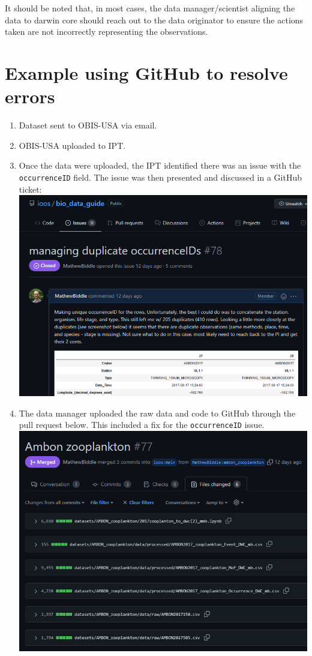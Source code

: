 \documentclass[
]{book}
\providecommand{\tightlist}{%
  \setlength{\itemsep}{0pt}\setlength{\parskip}{0pt}}
\begin{document}
It should be noted that, in most cases, the data manager/scientist aligning the data to darwin core should reach out
to the data originator to ensure the actions taken are not incorrectly representing the observations.

\hypertarget{example-using-github-to-resolve-errors}{%
\section{Example using GitHub to resolve errors}\label{example-using-github-to-resolve-errors}}

\begin{enumerate}
\def\labelenumi{\arabic{enumi}.}
\tightlist
\item
  Dataset sent to OBIS-USA via email.
\item
  OBIS-USA uploaded to IPT.
\item
  Once the data were uploaded, the IPT identified there was an issue with the \texttt{occurrenceID} field. The issue was then
  presented and discussed in a GitHub ticket:
  \href{https://github.com/ioos/bio_data_guide/issues/78}{\includegraphics{./figs/issue_78.png}}
\item
  The data manager uploaded the raw data and code to GitHub through the pull request below. This included a fix for
  the \texttt{occurrenceID} issue.
  \href{https://github.com/ioos/bio_data_guide/pull/77}{\includegraphics{./figs/PR_77.png}}

\end{enumerate}
\end{document}
